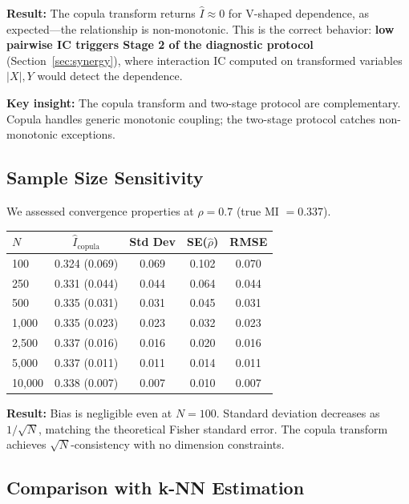 \documentclass[10pt]{article} %
\theoremstyle{plain}
\theoremstyle{definition}
\newcommand{\MI}{I}
\begin{document}
\textbf{Result:} The copula transform returns $\widehat{\MI} \approx 0$ for V-shaped dependence, as expected---the relationship is non-monotonic. This is the correct behavior: \textbf{low pairwise IC triggers Stage 2 of the diagnostic protocol} (Section~\ref{sec:synergy}), where interaction IC computed on transformed variables $|X|, Y$ would detect the dependence.

\textbf{Key insight:} The copula transform and two-stage protocol are complementary. Copula handles generic monotonic coupling; the two-stage protocol catches non-monotonic exceptions.

\subsection{Sample Size Sensitivity}

We assessed convergence properties at $\rho = 0.7$ (true MI $= 0.337$).

\begin{center}
\begin{tabular}{lcccc}
\toprule
$N$ & $\widehat{\MI}_{\text{copula}}$ & Std Dev & SE($\hat{\rho}$) & RMSE \\
\midrule
100 & 0.324 (0.069) & 0.069 & 0.102 & 0.070 \\
250 & 0.331 (0.044) & 0.044 & 0.064 & 0.044 \\
500 & 0.335 (0.031) & 0.031 & 0.045 & 0.031 \\
1,000 & 0.335 (0.023) & 0.023 & 0.032 & 0.023 \\
2,500 & 0.337 (0.016) & 0.016 & 0.020 & 0.016 \\
5,000 & 0.337 (0.011) & 0.011 & 0.014 & 0.011 \\
10,000 & 0.338 (0.007) & 0.007 & 0.010 & 0.007 \\
\bottomrule
\end{tabular}
\end{center}

\textbf{Result:} Bias is negligible even at $N = 100$. Standard deviation decreases as $1/\sqrt{N}$, matching the theoretical Fisher standard error. The copula transform achieves $\sqrt{N}$-consistency with no dimension constraints.

\subsection{Comparison with k-NN Estimation}
\end{document}
